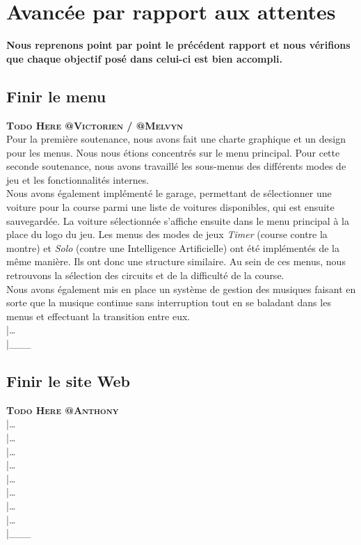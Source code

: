 \documentclass[12pt,a4paper]{article}
\newcommand{\AI}{Intelligence Artificielle}
\begin{document}
    \section{Avancée par rapport aux attentes}
        \textbf{Nous reprenons point par point le précédent rapport et nous vérifions que chaque objectif
        posé dans celui-ci est bien accompli.}


        \subsection{Finir le menu}
            \textbf{\textsc{Todo Here @Victorien / @Melvyn}}\\
            Pour la première soutenance, nous avons fait une charte graphique et un design pour les menus.
            Nous nous étions concentrés sur le menu principal. Pour cette seconde soutenance, nous avons travaillé les
            sous-menus des différents modes de jeu et les fonctionnalités internes.\\
            Nous avons également implémenté le garage, permettant de
            sélectionner une voiture pour la course parmi une liste de voitures disponibles, qui
            est ensuite sauvegardée. La voiture sélectionnée s'affiche ensuite dans le menu principal
            à la place du logo du jeu. Les menus des modes de
            jeux \textsl{Timer} (course contre la montre) et \textsl{Solo} (contre une \AI) ont
            été implémentés de la même manière. Ils ont donc une structure similaire. Au sein de
            ces menus, nous retrouvons la sélection des circuits et de la difficulté de la course.\\
            Nous avons également mis en place un système de gestion des musiques faisant en sorte
            que la musique continue sans interruption tout en se baladant dans les menus et
            effectuant la transition entre eux.\\
            |\dots\\|\_\_\_\\


        \subsection{Finir le site Web}
            \textbf{\textsc{Todo Here @Anthony}}\\
            |\dots\\|\dots\\|\dots\\|\dots\\|\dots\\|\dots\\|\dots\\|\dots\\|\_\_\_\\
\end{document}
